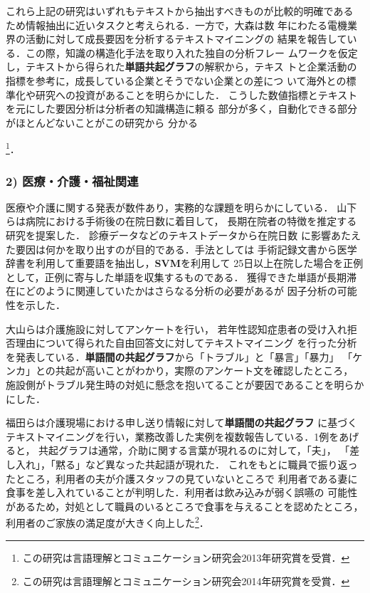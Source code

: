 \documentclass[twocolumn]{jarticle}
\begin{document}
これら上記の研究はいずれもテキストから抽出すべきものが比較的明確である
ため情報抽出に近いタスクと考えられる．一方で，大森\cite{ohmori2013}は数
年にわたる電機業界の活動に対して成長要因を分析するテキストマイニングの
結果を報告している．この際，知識の構造化手法を取り入れた独自の分析フレー
ムワークを仮定し，テキストから得られた{\bf 単語共起グラフ}の解釈から，テキス
トと企業活動の指標を参考に，成長している企業とそうでない企業との差につ
いて海外との標準化や研究への投資があることを明らかにした．
こうした数値指標とテキストを元にした要因分析は分析者の知識構造に頼る
部分が多く，自動化できる部分がほとんどないことがこの研究から
分かる{\footnote{この研究は言語理解とコミュニケーション研究会2013年研究賞を受賞．}．

\subsubsection*{2) 医療・介護・福祉関連}
医療や介護に関する発表が数件あり，実務的な課題を明らかにしている．
山下ら\cite{yamashita2014}は病院における手術後の在院日数に着目して，
長期在院者の特徴を推定する研究を提案した．
診療データなどのテキストデータから在院日数
に影響あたえた要因は何かを取り出すのが目的である．手法としては
手術記録文書から医学辞書を利用して重要語を抽出し，{\bf SVM}を利用して
25日以上在院した場合を正例として，正例に寄与した単語を収集するものである．
獲得できた単語が長期滞在にどのように関連していたかはさらなる分析の必要があるが
因子分析の可能性を示した．

大山らは\cite{ohyama2014}介護施設に対してアンケートを行い，
若年性認知症患者の受け入れ拒否理由について得られた自由回答文に対してテキストマイニング
を行った分析を発表している．{\bf 単語間の共起グラフ}から「トラブル」と「暴言」「暴力」 
「ケンカ」との共起が高いことがわかり，実際のアンケート文を確認したところ，
施設側がトラブル発生時の対処に懸念を抱いてることが要因であることを明らかにした．

福田ら\cite{fukuda2014}は介護現場における申し送り情報に対して{\bf 単語間の共起グラフ}
に基づくテキストマイニングを行い，業務改善した実例を複数報告している．1例をあげると，
共起グラフは通常，介助に関する言葉が現れるのに対して，「夫」，
「差し入れ」，「黙る」など異なった共起語が現れた．
これをもとに職員で振り返ったところ，利用者の夫が介護スタッフの見ていないところで
利用者である妻に食事を差し入れていることが判明した．利用者は飲み込みが弱く誤嚥の
可能性があるため，対処として職員のいるところで食事を与えることを認めたところ，
利用者のご家族の満足度が大きく向上した\footnote{この研究は言語理解とコミュニケーション研究会2014年研究賞を受賞．}．

}
\end{document}
